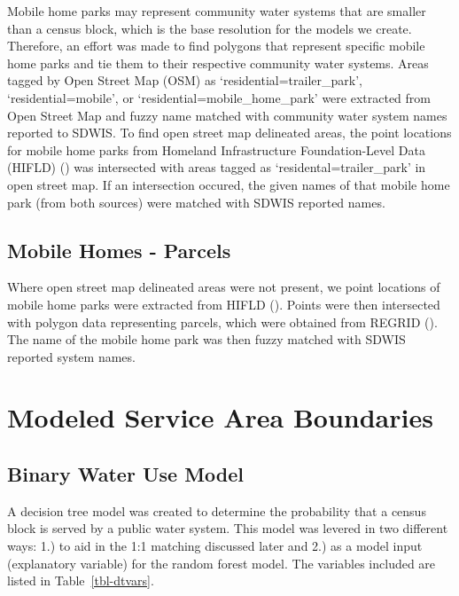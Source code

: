 \documentclass[12pt]{article}
\begin{document}
Mobile home parks may represent community water systems that are smaller
than a census block, which is the base resolution for the models we
create. Therefore, an effort was made to find polygons that represent
specific mobile home parks and tie them to their respective community
water systems. Areas tagged by Open Street Map (OSM) as
`residential=trailer\_park', `residential=mobile', or
`residential=mobile\_home\_park' were extracted from Open Street Map and
fuzzy name matched with community water system names reported to SDWIS.
To find open street map delineated areas, the point locations for mobile
home parks from Homeland Infrastructure Foundation-Level Data (HIFLD)
() was intersected with areas tagged as
`residental=trailer\_park' in open street map. If an intersection
occured, the given names of that mobile home park (from both sources)
were matched with SDWIS reported names.

\subsection{Mobile Homes - Parcels}\label{mobile-homes---parcels}

Where open street map delineated areas were not present, we point
locations of mobile home parks were extracted from HIFLD
(). Points were then intersected with polygon
data representing parcels, which were obtained from REGRID
(). The name of the mobile home park was then
fuzzy matched with SDWIS reported system names.

\section{Modeled Service Area
Boundaries}\label{modeled-service-area-boundaries}

\subsection{Binary Water Use Model}\label{binary-water-use-model}

A decision tree model was created to determine the probability that a
census block is served by a public water system. This model was levered
in two different ways: 1.) to aid in the 1:1 matching discussed later
and 2.) as a model input (explanatory variable) for the random forest
model. The variables included are listed in Table~\ref{tbl-dtvars}.
\end{document}
